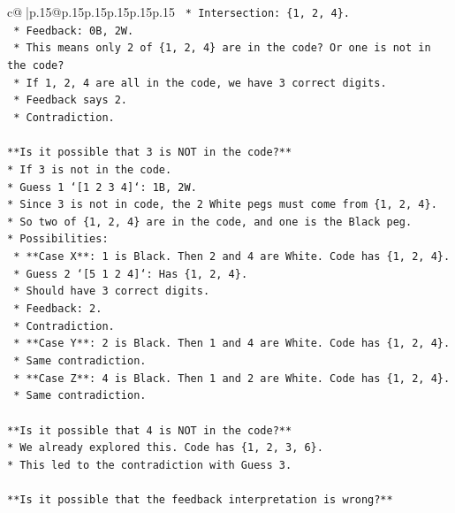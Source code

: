 \documentclass{article}
\begin{document}
{\begin{supertabular}{c@{$\;$}|p{.15\linewidth}@{}p{.15\linewidth}p{.15\linewidth}p{.15\linewidth}p{.15\linewidth}p{.15\linewidth}}
{{{\texttt{    *   Intersection: \{1, 2, 4\}.} \\
\texttt{    *   Feedback: 0B, 2W.} \\
\texttt{    *   This means only 2 of \{1, 2, 4\} are in the code? Or one is not in the code?} \\
\texttt{    *   If 1, 2, 4 are all in the code, we have 3 correct digits.} \\
\texttt{    *   Feedback says 2.} \\
\texttt{    *   Contradiction.} \\
\\ 
\texttt{**Is it possible that 3 is NOT in the code?**} \\
\texttt{*   If 3 is not in the code.} \\
\texttt{*   Guess 1 `{[}1 2 3 4{]}`: 1B, 2W.} \\
\texttt{*   Since 3 is not in code, the 2 White pegs must come from \{1, 2, 4\}.} \\
\texttt{*   So two of \{1, 2, 4\} are in the code, and one is the Black peg.} \\
\texttt{*   Possibilities:} \\
\texttt{    *   **Case X**: 1 is Black. Then 2 and 4 are White. Code has \{1, 2, 4\}.} \\
\texttt{        *   Guess 2 `{[}5 1 2 4{]}`: Has \{1, 2, 4\}.} \\
\texttt{        *   Should have 3 correct digits.} \\
\texttt{        *   Feedback: 2.} \\
\texttt{        *   Contradiction.} \\
\texttt{    *   **Case Y**: 2 is Black. Then 1 and 4 are White. Code has \{1, 2, 4\}.} \\
\texttt{        *   Same contradiction.} \\
\texttt{    *   **Case Z**: 4 is Black. Then 1 and 2 are White. Code has \{1, 2, 4\}.} \\
\texttt{        *   Same contradiction.} \\
\\ 
\texttt{**Is it possible that 4 is NOT in the code?**} \\
\texttt{*   We already explored this. Code has \{1, 2, 3, 6\}.} \\
\texttt{*   This led to the contradiction with Guess 3.} \\
\\ 
\texttt{**Is it possible that the feedback interpretation is wrong?**} \\
}}}
\end{supertabular}}
\end{document}
